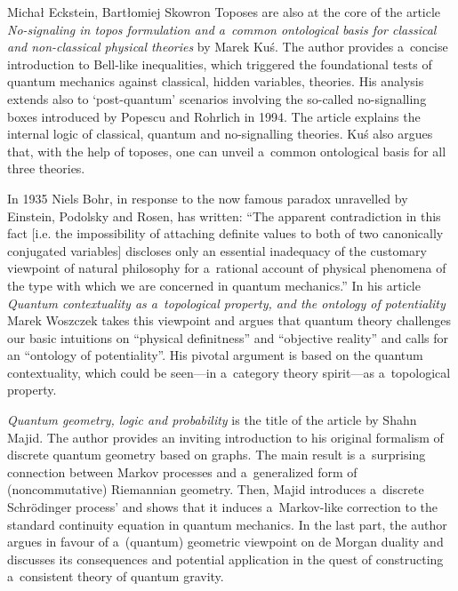 \begin{editorialeng}{Michał Eckstein, Bartłomiej Skowron}
Toposes are also at the core of the article \textit{No-signaling in topos formulation and a~common ontological basis for classical and non-classical physical theories} by Marek Kuś. The author provides a~concise introduction to Bell-like inequalities, which triggered the foundational tests of quantum mechanics against classical, hidden variables, theories. His analysis extends also to ‘post-quantum' scenarios involving the so-called no-signalling boxes introduced by Popescu and Rohrlich in 1994. The article explains the internal logic of classical, quantum and no-signalling theories. Kuś also argues that, with the help of toposes, one can unveil a~common ontological basis for all three theories.

In 1935 Niels Bohr, in response to the now famous paradox unravelled by Einstein, Podolsky and Rosen, has written: ``The apparent contradiction in this fact [i.e. the impossibility of attaching definite values to both of two canonically conjugated variables] discloses only an essential inadequacy of the customary viewpoint of natural philosophy for a~rational account of physical phenomena of the type with which we are concerned in quantum mechanics.'' In his article \textit{Quantum contextuality as a~topological property, and the ontology of potentiality} Marek Woszczek takes this viewpoint and argues that quantum theory challenges our basic intuitions on ``physical definitness'' and ``objective reality'' and calls for an ``ontology of potentiality''. His pivotal argument is based on the quantum contextuality, which could be seen---in a~category theory spirit---as a~topological property.

\textit{Quantum geometry, logic and probability} is the title of the article by Shahn Majid. The author provides an inviting introduction to his original formalism of discrete quantum geometry based on graphs. The main result is a~surprising connection between Markov processes and a~generalized form of (noncommutative) Riemannian geometry. Then, Majid introduces a~{\textasciigrave}discrete Schrödinger process' and shows that it induces a~Markov-like correction to the standard continuity equation in quantum mechanics. In the last part, the author argues in favour of a~(quantum) geometric viewpoint on de Morgan duality and discusses its consequences and potential application in the quest of constructing a~consistent theory of quantum gravity.


\end{editorialeng}
